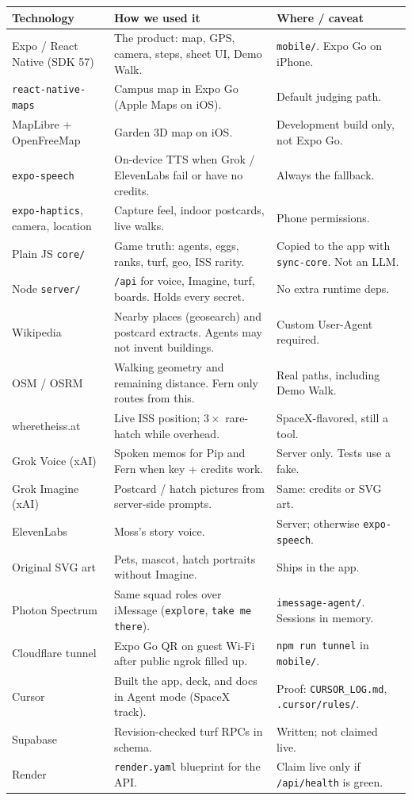 \documentclass[11pt]{article}
\begin{document}
{\small
\begin{tabular}{@{}P{0.26\textwidth}P{0.42\textwidth}P{0.26\textwidth}@{}}
\toprule
\textbf{Technology} & \textbf{How we used it} & \textbf{Where / caveat} \\
\midrule
Expo / React Native (SDK 57)
  & The product: map, GPS, camera, steps, sheet UI, Demo Walk.
  & \texttt{mobile/}. Expo Go on iPhone. \\
\texttt{react-native-maps}
  & Campus map in Expo Go (Apple Maps on iOS).
  & Default judging path. \\
MapLibre + OpenFreeMap
  & Garden 3D map on iOS.
  & Development build only, not Expo Go. \\
\texttt{expo-speech}
  & On-device TTS when Grok / ElevenLabs fail or have no credits.
  & Always the fallback. \\
\texttt{expo-haptics}, camera, location
  & Capture feel, indoor postcards, live walks.
  & Phone permissions. \\
Plain JS \texttt{core/}
  & Game truth: agents, eggs, ranks, turf, geo, ISS rarity.
  & Copied to the app with \texttt{sync-core}. Not an LLM. \\
Node \texttt{server/}
  & \texttt{/api} for voice, Imagine, turf, boards. Holds every secret.
  & No extra runtime deps. \\
Wikipedia
  & Nearby places (geosearch) and postcard extracts. Agents may not invent buildings.
  & Custom User-Agent required. \\
OSM / OSRM
  & Walking geometry and remaining distance. Fern only routes from this.
  & Real paths, including Demo Walk. \\
wheretheiss.at
  & Live ISS position; $3\times$ rare-hatch while overhead.
  & SpaceX-flavored, still a tool. \\
Grok Voice (xAI)
  & Spoken memos for Pip and Fern when key + credits work.
  & Server only. Tests use a fake. \\
Grok Imagine (xAI)
  & Postcard / hatch pictures from server-side prompts.
  & Same: credits or SVG art. \\
ElevenLabs
  & Moss's story voice.
  & Server; otherwise \texttt{expo-speech}. \\
Original SVG art
  & Pets, mascot, hatch portraits without Imagine.
  & Ships in the app. \\
Photon Spectrum
  & Same squad roles over iMessage (\texttt{explore}, \texttt{take me there}).
  & \texttt{imessage-agent/}. Sessions in memory. \\
Cloudflare tunnel
  & Expo Go QR on guest Wi-Fi after public ngrok filled up.
  & \texttt{npm run tunnel} in \texttt{mobile/}. \\
Cursor
  & Built the app, deck, and docs in Agent mode (SpaceX track).
  & Proof: \texttt{CURSOR\_LOG.md}, \texttt{.cursor/rules/}. \\
Supabase
  & Revision-checked turf RPCs in schema.
  & Written; not claimed live. \\
Render
  & \texttt{render.yaml} blueprint for the API.
  & Claim live only if \texttt{/api/health} is green. \\
\bottomrule
\end{tabular}
}
\end{document}
